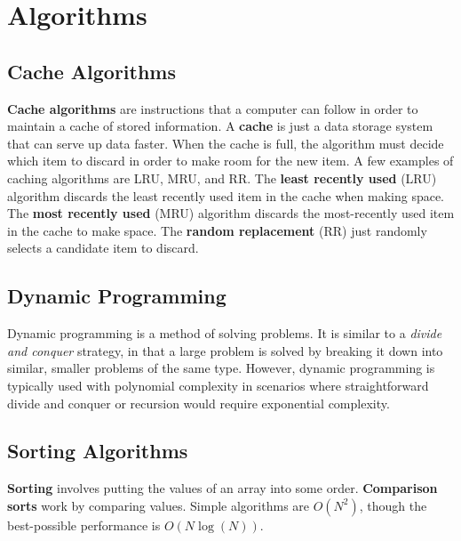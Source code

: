 \section{Algorithms}

\subsection{Cache Algorithms}

\textbf{Cache algorithms} are instructions that a computer can follow in order to maintain a cache of stored information. A \textbf{cache} is just a data storage system that can serve up data faster. When the cache is full, the algorithm must decide which item to discard in order to make room for the new item. A few examples of caching algorithms are LRU, MRU, and RR. The \textbf{least recently used} (LRU) algorithm discards the least recently used item in the cache when making space. The \textbf{most recently used} (MRU) algorithm discards the most-recently used item in the cache to make space. The \textbf{random replacement} (RR) just randomly selects a candidate item to discard. 

\subsection{Dynamic Programming}

Dynamic programming is a method of solving problems. It is similar to a \textit{divide and conquer} strategy, in that a large problem is solved by breaking it down into similar, smaller problems of the same type. However, dynamic programming is typically used with polynomial complexity in scenarios where straightforward divide and conquer or recursion would require exponential complexity.

\subsection{Sorting Algorithms}

\textbf{Sorting} involves putting the values of an array into some order. \textbf{Comparison sorts} work by comparing values. Simple algorithms are $O(N^{2})$, though the best-possible performance is $O(N\log(N))$. \\


